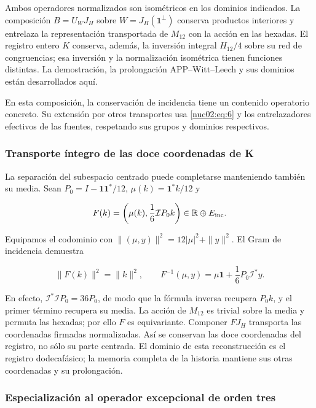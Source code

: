 Ambos operadores normalizados son isométricos en los dominios indicados. La composición \(B=U_WJ_H\) sobre \(W=J_H(\mathbf1^\perp)\) conserva productos interiores y entrelaza la representación transportada de \(M_{12}\) con la acción en las hexadas. El registro entero \(K\) conserva, además, la inversión integral \(H_{12}/4\) sobre su red de congruencias; esa inversión y la normalización isométrica tienen funciones distintas. La demostración, la prolongación APP–Witt–Leech y sus dominios están desarrollados aquí.

En esta composición, la conservación de incidencia tiene un contenido operatorio concreto. Su extensión por otros transportes usa \eqref{nuc02:eq:6} y los entrelazadores efectivos de las fuentes, respetando sus grupos y dominios respectivos.

\subsubsection{Transporte íntegro de las doce coordenadas de K}

La separación del subespacio centrado puede completarse manteniendo también su media. Sean \(P_0=I-\mathbf1\mathbf1^*/12\), \(\mu(k)=\mathbf1^*k/12\) y

\[
F(k)=\left(\mu(k),\frac16\mathcal I P_0k\right)\in\mathbb R\oplus E_{\rm inc}.
\]

Equipamos el codominio con \(\|(\mu,y)\|^2=12|\mu|^2+\|y\|^2\). El Gram de incidencia demuestra

\begin{equation}
\|F(k)\|^2=\|k\|^2,\qquad
\boxed{F^{-1}(\mu,y)=\mu\mathbf1+\frac16P_0\mathcal I^*y.}\label{nuc02:eq:6a}
\end{equation}

En efecto, \(\mathcal I^*\mathcal I P_0=36P_0\), de modo que la fórmula inversa recupera \(P_0k\), y el primer término recupera su media. La acción de \(M_{12}\) es trivial sobre la media y permuta las hexadas; por ello \(F\) es equivariante. Componer \(FJ_H\) transporta las coordenadas firmadas normalizadas. Así se conservan las doce coordenadas del registro, no sólo su parte centrada. El dominio de esta reconstrucción es el registro dodecafásico; la memoria completa de la historia mantiene sus otras coordenadas y su prolongación.

\subsubsection{Especialización al operador excepcional de orden tres}

